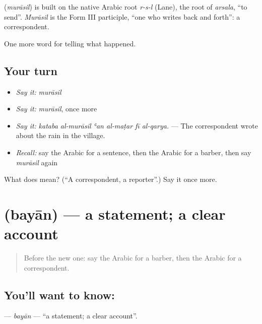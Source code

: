 \begin{cousinweb}
\textbf{} (\emph{murāsil}) is built on the native Arabic root \emph{r-s-l} (Lane), the root of \emph{arsala}, \textquotedblleft{}to send\textquotedblright{}. \emph{Murāsil} is the Form III participle, \textquotedblleft{}one who writes back and forth\textquotedblright{}: a correspondent.
\end{cousinweb}

\begin{grammarlens}[title={What you've built}]
One more word for telling what happened.
\end{grammarlens}

\subsection*{Your turn}
\begin{itemize}
\raggedright
  \item \emph{Say it:} \emph{murāsil}
  \item \emph{Say it:} \emph{murāsil}, once more
  \item \emph{Say it:} \emph{kataba al-murāsil ʿan al-maṭar fī al-qarya.} — The correspondent wrote about the rain in the village.
  \item \emph{Recall:} say the Arabic for a sentence, then the Arabic for a barber, then say \emph{murāsil} again
\end{itemize}

\begin{tcolorbox}[breakable,colback=teal!4,colframe=teal!35!black,title={Before you move on}]
What does  mean? (\textquotedblleft{}A correspondent, a reporter\textquotedblright{}.) Say it once more.
\end{tcolorbox}
\section[\texorpdfstring{\ar{بيان} (bayān)}{بيان (bayān)}]{ (bayān) — a statement; a clear account}

\label{lesson:AR-C293-bayan}



\begin{quote}
Before the new one: say the Arabic for a barber, then the Arabic for a correspondent.
\end{quote}

\subsection*{You'll want to know: }
\textbf{} — \emph{bayān} — \textquotedblleft{}a statement; a clear account\textquotedblright{}.

